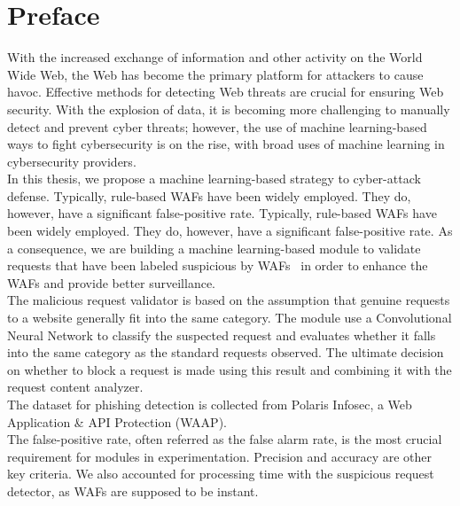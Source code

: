 \chapter*{Preface}
\thispagestyle{fancy}
\label{tom_tat}
\hspace*{5cm}

With the increased exchange of information and other activity on the World Wide Web, the Web has become the primary platform for attackers to cause havoc. Effective methods for detecting Web threats are crucial for ensuring Web security. With the explosion of data, it is becoming more challenging to manually detect and prevent cyber threats; however, the use of machine learning-based ways to fight cybersecurity is on the rise, with broad uses of machine learning in cybersecurity providers. \\
In this thesis, we propose a machine learning-based strategy to cyber-attack defense. Typically, rule-based WAFs have been widely employed. They do, however, have a significant false-positive rate. Typically, rule-based WAFs have been widely employed. They do, however, have a significant false-positive rate. As a consequence, we are building a machine learning-based module to validate requests that have been labeled suspicious by WAFs  in order to enhance the WAFs and provide better surveillance. \\
The malicious request validator is based on the assumption that genuine requests to a website generally fit into the same category. The module use a Convolutional Neural Network to classify the suspected request and evaluates whether it falls into the same category as the standard requests observed. The ultimate decision on whether to block a request is made using this result and combining it with the request content analyzer.\\
The dataset for phishing detection is collected from Polaris Infosec, a Web Application \& API Protection (WAAP).\\
The false-positive rate, often referred as the false alarm rate, is the most crucial requirement for modules in experimentation. Precision and accuracy are other key criteria. We also accounted for processing time with the suspicious request detector, as WAFs are supposed to be instant.
	
\cleardoublepage